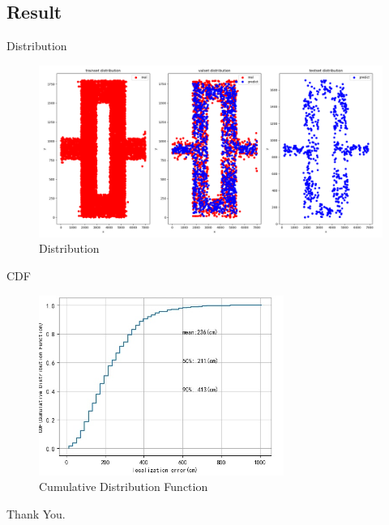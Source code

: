 \documentclass[aspectratio=43]{beamer}
\begin{document}
\subsection{Result}
\begin{frame}{Distribution}
\begin{figure}[!htbp]
  \centering
  \includegraphics[width=12cm]{distribution.png}
  \caption{Distribution}
\end{figure}
\end{frame}

\begin{frame}{CDF}
\begin{figure}
  \centering
  \includegraphics[width=8cm]{cdf.png}
  \caption{Cumulative Distribution Function}
\end{figure}
\end{frame}

\begin{frame}
\begin{block}{Thank You.}
\end{block}
\end{frame}
\end{document}
